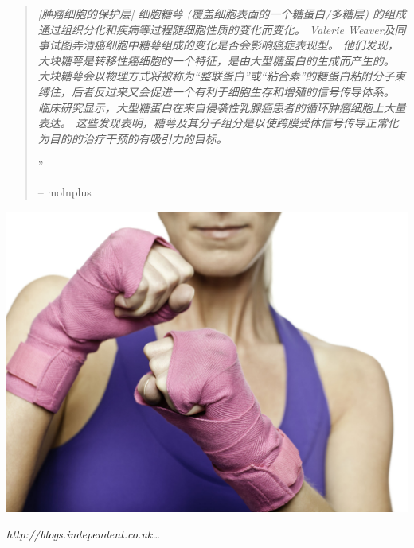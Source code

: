 \documentclass[10pt,a4paper]{article}
\begin{document}
\begin{multicols}{2}
\begin{quotation} %

\noindent\normalsize\textit{[肿瘤细胞的保护层] 细胞糖萼 (覆盖细胞表面的一个糖蛋白/多糖层) 的组成通过组织分化和疾病等过程随细胞性质的变化而变化。
Valerie Weaver及同事试图弄清癌细胞中糖萼组成的变化是否会影响癌症表现型。
他们发现，大块糖萼是转移性癌细胞的一个特征，是由大型糖蛋白的生成而产生的。
大块糖萼会以物理方式将被称为``整联蛋白''或``粘合素''的糖蛋白粘附分子束缚住，后者反过来又会促进一个有利于细胞生存和增殖的信号传导体系。
临床研究显示，大型糖蛋白在来自侵袭性乳腺癌患者的循环肿瘤细胞上大量表达。
这些发现表明，糖萼及其分子组分是以使跨膜受体信号传导正常化为目的的治疗干预的有吸引力的目标。\cite{PasDuFRos1406,EwaEge1406}}

\hfill{\Huge''}

\hfill-- molnplus
\end{quotation}


\end{multicols} %

\begin{center}
\vspace{10pt}
\includegraphics[width=1\linewidth]{cancer-fight-blogs.jpg} %
\par\large\textit{http://blogs.independent.co.uk\ldots}
\vspace{10pt}
\end{center}
\end{document}
